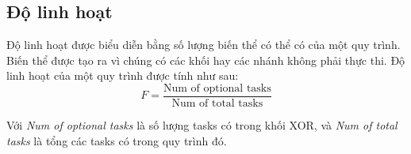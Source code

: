 \subsection{Độ linh hoạt}
Độ linh hoạt được biểu diễn bằng số lượng biến thể có thể có của một quy trình. Biến thể được tạo ra vì chúng có các khối hay các nhánh không phải thực thi. Độ linh hoạt của một quy trình được tính như sau:
\[F = \frac{\text{Num of optional tasks}}{\text{Num of total tasks}}\]
\par
Với \emph{Num of optional tasks} là số lượng tasks có trong khối XOR, và \emph{Num of total tasks} là tổng các tasks có trong quy trình đó.